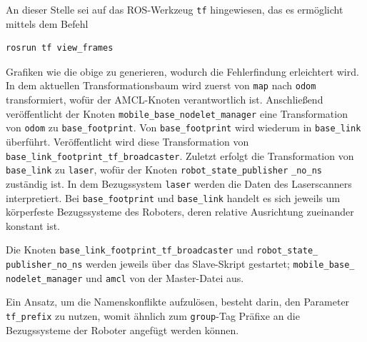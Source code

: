 An dieser Stelle sei auf das ROS-Werkzeug \lstinline{tf}{} hingewiesen, das es ermöglicht mittels dem Befehl
\begin{lstlisting}
rosrun tf view_frames
\end{lstlisting}
Grafiken wie die obige zu generieren, wodurch die Fehlerfindung erleichtert wird. In dem aktuellen Transformationsbaum wird zuerst von \lstinline{map}{} nach \lstinline{odom}{} transformiert, wofür der AMCL-Knoten verantwortlich ist. Anschließend veröffentlicht der Knoten \lstinline{mobile_base_nodelet_manager}{} eine Transformation von \lstinline{odom}{} zu \lstinline{base_footprint}{}. Von \lstinline{base_footprint}{} wird wiederum in \lstinline{base_link}{} überführt. Veröffentlicht wird diese Transformation von \lstinline{base_link_footprint_tf_broadcaster}{}. Zuletzt erfolgt die Transformation von \lstinline{base_link}{} zu \lstinline{laser}{}, wofür der Knoten \lstinline{robot_state_publisher} \lstinline{_no_ns}{} zuständig ist. In dem Bezugssystem \lstinline{laser}{} werden die Daten des Laserscanners interpretiert. Bei \lstinline{base_footprint}{} und \lstinline{base_link}{} handelt es sich jeweils um körperfeste Bezugssysteme des Roboters, deren relative Ausrichtung zueinander konstant ist.

Die Knoten \lstinline{base_link_footprint_tf_broadcaster}{} und \lstinline{robot_state_}  \lstinline{publisher_no_ns}{} werden jeweils über das Slave-Skript gestartet; \lstinline{mobile_base_}{} \lstinline{nodelet_manager}{} und \lstinline{amcl}{} von der Master-Datei aus.

Ein Ansatz, um die Namenskonflikte aufzulösen, besteht darin, den Parameter \lstinline{tf_prefix}{} zu nutzen, womit ähnlich zum \lstinline{group}{}-Tag Präfixe an die Bezugssysteme der Roboter angefügt werden können.

